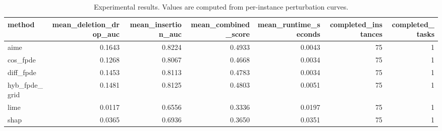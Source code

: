 \begin{table}[t]
\caption{Experimental results. Values are computed from per-instance perturbation curves.}
\label{tab:main_results_computed}
\centering
\begin{tabular}{lrrrrrr}
\toprule
method & mean\_deletion\_drop\_auc & mean\_insertion\_auc & mean\_combined\_score & mean\_runtime\_seconds & completed\_instances & completed\_tasks \\
\midrule
aime & 0.1643 & 0.8224 & 0.4933 & 0.0043 & 75 & 1 \\
cos\_fpde & 0.1268 & 0.8067 & 0.4668 & 0.0034 & 75 & 1 \\
diff\_fpde & 0.1453 & 0.8113 & 0.4783 & 0.0034 & 75 & 1 \\
hyb\_fpde\_grid & 0.1481 & 0.8125 & 0.4803 & 0.0051 & 75 & 1 \\
lime & 0.0117 & 0.6556 & 0.3336 & 0.0197 & 75 & 1 \\
shap & 0.0365 & 0.6936 & 0.3650 & 0.0351 & 75 & 1 \\
\bottomrule
\end{tabular}

\end{table}
